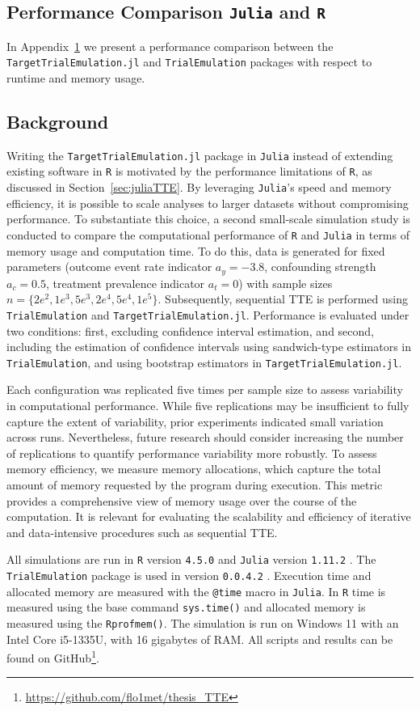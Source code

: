 \documentclass[pdflatex,sn-vancouver-ay]{sn-jnl}%
\theoremstyle{thmstyleone}%
\theoremstyle{thmstyletwo}%
\theoremstyle{thmstylethree}%
\newcommand{\Rlang}{\texttt{R}}
\newcommand{\julia}{\texttt{Julia}}
\newcommand{\RTTE}{\texttt{TrialEmulation}}
\newcommand{\juliaTTE}{\texttt{TargetTrialEmulation.jl}}
\begin{document}
\begin{appendices}
\section{Performance Comparison \julia{} and \Rlang{}}\label{Apx:speed}
In Appendix~\ref{Apx:speed} we present a performance comparison between the \juliaTTE{} and \RTTE{} packages with respect to runtime and memory usage.

\subsection{Background}
Writing the \juliaTTE{} package in \julia{} instead of extending existing software in \Rlang{} is motivated by the performance limitations of \Rlang{}, as discussed in Section~\ref{sec:juliaTTE}. By leveraging \julia{}'s speed and memory efficiency, it is possible to scale analyses to larger datasets without compromising performance. To substantiate this choice, a second small-scale simulation study is conducted to compare the computational performance of \Rlang{} and \julia{} in terms of memory usage and computation time. To do this, data is generated for fixed parameters (outcome event rate indicator $a_y = -3.8$, confounding strength $a_c = 0.5$, treatment prevalence indicator $a_t = 0$) with sample sizes $n = \{2e^2, 1e^3,5e^3,2e^4, 5e^4, 1e^5\}$. Subsequently, sequential TTE is performed using \RTTE{} and \juliaTTE{}. Performance is evaluated under two conditions: first, excluding confidence interval estimation, and second, including the estimation of confidence intervals using sandwich-type estimators in \RTTE{}, and using bootstrap estimators in \juliaTTE{}.

Each configuration was replicated five times per sample size to assess variability in computational performance. While five replications may be insufficient to fully capture the extent of variability, prior experiments indicated small variation across runs. Nevertheless, future research should consider increasing the number of replications to quantify performance variability more robustly. To assess memory efficiency, we measure memory allocations, which capture the total amount of memory requested by the program during execution. This metric provides a comprehensive view of memory usage over the course of the computation. It is relevant for evaluating the scalability and efficiency of iterative and data-intensive procedures such as sequential TTE.

All simulations are run in \Rlang{} version \texttt{4.5.0} \citep{R_cite} and \julia{} version \texttt{1.11.2} \citep{bezansonJuliaFreshApproach2017}. The \RTTE{} package is used in version \texttt{0.0.4.2} \citep{suTrialEmulationPackageEmulate2024}. Execution time and allocated memory are measured with the \texttt{@time} macro in \julia{}. In \Rlang{} time is measured using the base command \texttt{sys.time()} and allocated memory is measured using the \texttt{Rprofmem()}. The simulation is run on Windows 11 with an Intel Core i5-1335U, with 16 gigabytes of RAM. All scripts and results can be found on GitHub\footnote{\url{https://github.com/flo1met/thesis_TTE}}.


\end{appendices}
\end{document}
